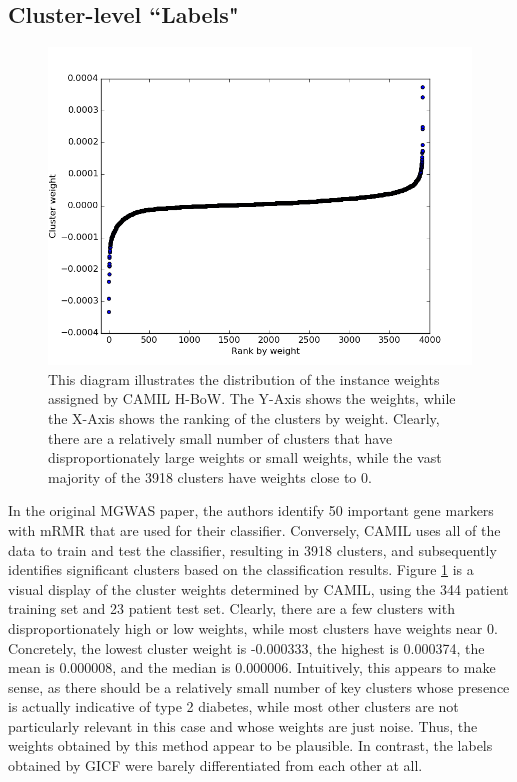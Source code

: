 \subsection{Cluster-level ``Labels"}

\begin{figure}[h]
\centering
\includegraphics[scale=0.4]{./instance-scatter.png}
\caption{This diagram illustrates the distribution of the instance weights assigned by CAMIL H-BoW. The Y-Axis shows the weights, while the X-Axis shows the ranking of the clusters by weight. Clearly, there are a relatively small number of clusters that have disproportionately large weights or small weights, while the vast majority of the 3918 clusters have weights close to 0.} \label{instance-scatter}
\end{figure}

In the original MGWAS paper, the authors identify 50 important gene markers with mRMR that are used for their classifier. Conversely, CAMIL uses all of the data to train and test the classifier, resulting in 3918 clusters, and subsequently identifies significant clusters based on the classification results. Figure \ref{instance-scatter} is a visual display of the cluster weights determined by CAMIL, using the 344 patient training set and 23 patient test set. Clearly, there are a few clusters with disproportionately high or low weights, while most clusters have weights near 0. Concretely, the lowest cluster weight is -0.000333, the highest is 0.000374, the mean is 0.000008, and the median is 0.000006. Intuitively, this appears to make sense, as there should be a relatively small number of key clusters whose presence is actually indicative of type 2 diabetes, while most other clusters are not particularly relevant in this case and whose weights are just noise. Thus, the weights obtained by this method appear to be plausible. In contrast, the labels obtained by GICF were barely differentiated from each other at all.
